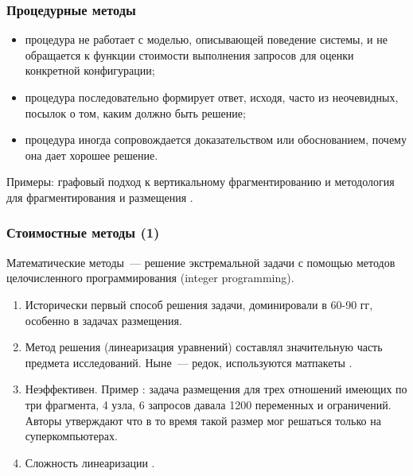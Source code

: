 \documentclass[unicode]{beamer}
\begin{document}


\begin{frame}
\frametitle{Процедурные методы}

\begin{itemize}
  \setlength\itemsep{1em}	
  \item процедура не работает с моделью, описывающей поведение системы, и не обращается к функции стоимости выполнения запросов для оценки конкретной конфигурации;
  \item процедура последовательно формирует ответ, исходя, часто из неочевидных, посылок о том, каким должно быть решение;
  \item процедура иногда сопровождается доказательством или обоснованием, почему она дает хорошее решение.
\end{itemize}

Примеры: графовый подход к вертикальному фрагментированию \cite{p7} и методология для фрагментирования и размещения \cite{p8}.

\end{frame}

\begin{frame}
\frametitle{Стоимостные методы (1)}

Математические методы~--- решение экстремальной задачи с помощью методов целочисленного программирования (integer programming).

\begin{enumerate}
  \setlength\itemsep{1em}	
  \item Исторически первый способ решения задачи, доминировали в 60-90 гг, особенно в задачах размещения. 
  \item Метод решения (линеаризация уравнений) составлял значительную часть предмета исследований. Ныне~--- редок, используются матпакеты \cite{p14}.
  \item Неэффективен. Пример \cite{p9}: задача размещения для трех отношений имеющих по три фрагмента, 4 узла, 6 запросов давала 1200 переменных и ограничений. Авторы утверждают что в то время такой размер мог решаться только на суперкомпьютерах. 
  \item Сложность линеаризации \cite{p13}.
\end{enumerate}

\end{frame}
\end{document}
